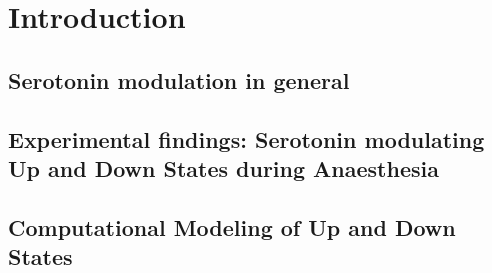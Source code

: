 \chapter{Introduction\label{cha:introduction}}
\section{Serotonin modulation in general}
\noindent
\indent

\section{Experimental findings: Serotonin modulating Up and Down States during Anaesthesia}
\noindent
\indent 

\section{Computational Modeling of Up and Down States}
\noindent      
\indent